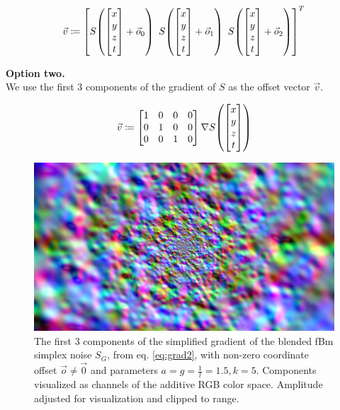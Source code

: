 \begin{equation}
    \vec{v} \coloneqq \mleft[ S\mleft(\begin{bmatrix}x\\y\\z\\t\end{bmatrix} + \vec{o}_0\mright) \enspace S\mleft(\begin{bmatrix}x\\y\\z\\t\end{bmatrix} + \vec{o}_1\mright) \enspace S\mleft(\begin{bmatrix}x\\y\\z\\t\end{bmatrix} + \vec{o}_2\mright) \mright]^T
\end{equation}

\textbf{Option two.}\\We use the first 3 components of the gradient of $S$ as the offset vector $\vec{v}$.

\begin{equation}
    \vec{v} \coloneqq \begin{bmatrix}1&0&0&0\\0&1&0&0\\0&0&1&0\end{bmatrix} \nabla S\mleft(\begin{bmatrix}x\\y\\z\\t\end{bmatrix}\mright)
\end{equation}

\begin{figure}[H]
    \centering
    \ifgraphics
        \includegraphics[width=\linewidth]{img/noise-grad-original.png}%
    \fi
    \caption{The first 3 components of the simplified gradient of the blended \ac{fBm} simplex noise $S_G$, from eq. \ref{eq:grad2}, with non-zero coordinate offset $\vec{o} \ne \vec{0}$ and parameters $a = g = \frac{1}{l} = 1.5, k = 5$. Components visualized as channels of the additive RGB color space. Amplitude adjusted for visualization and clipped to range.}
    \label{fig:noise-grad-original}
\end{figure}

